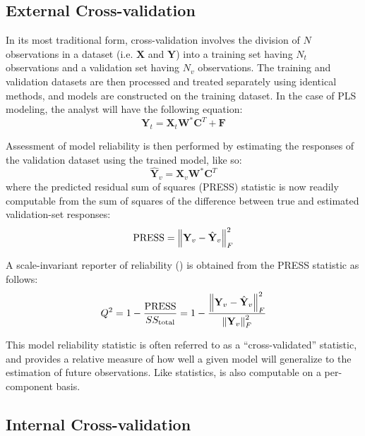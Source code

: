 \subsection{External Cross-validation}

\begin{doublespace}
In its most traditional form, cross-validation involves the division of $N$
observations in a dataset (i.e. $\mathbf{X}$ and $\mathbf{Y}$) into a training
set having $N_t$ observations and a validation set having $N_v$ observations.
The training and validation datasets are then processed and treated separately
using identical methods, and models are constructed on the training dataset.
In the case of PLS modeling, the analyst will have the following equation:
\begin{equation}
\mathbf{Y}_t = \mathbf{X}_t \mathbf{W}^\ast \mathbf{C}^T + \mathbf{F}
\end{equation}

Assessment of model reliability is then performed by estimating the responses
of the validation dataset using the trained model, like so:
\begin{equation}
\hat{\mathbf{Y}}_v = \mathbf{X}_v \mathbf{W}^\ast \mathbf{C}^T
\end{equation}
where the predicted residual sum of squares (PRESS) statistic is now readily
computable from the sum of squares of the difference between true and estimated
validation-set responses:
\begin{equation}
\mathrm{PRESS} = \left\| \mathbf{Y}_v - \hat{\mathbf{Y}}_v \right\|_F^2
\end{equation}

A scale-invariant reporter of reliability (\qsq{}) is obtained from the PRESS
statistic as follows:
\begin{equation}
Q^2
 = 1 - \frac{\mathrm{PRESS}}{SS_{\mathrm{total}}{}}
 = 1 - \frac{\left\| \mathbf{Y}_v - \hat{\mathbf{Y}}_v \right\|_F^2}{\left\| \mathbf{Y}_v \right\|_F^2}
\end{equation}

This model reliability statistic is often referred to as a ``cross-validated''
\rsq{} statistic, and provides a relative measure of how well a given model
will generalize to the estimation of future observations. Like \rsq{}
statistics, \qsq{} is also computable on a per-component basis.
\end{doublespace}

\subsection{Internal Cross-validation}

